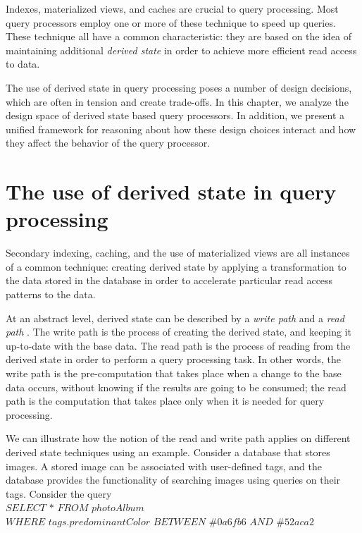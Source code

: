 Indexes, materialized views, and caches are crucial to query processing.
Most query processors employ one or more of these technique to speed up queries.
These technique all have a common characteristic:
they are based on the idea of maintaining additional \textit{derived state} in order to achieve more efficient read
access to data.

The use of derived state in query processing poses a number of design decisions,
which are often in tension and create trade-offs.
In this chapter, we analyze the design space of derived state based query processors.
In addition, we present a unified framework for reasoning about how these design choices interact
and how they affect the behavior of the query processor.


\section{The use of derived state in query processing}
\label{sec:read_write_path}

Secondary indexing, caching, and the use of materialized views are all instances of a common technique:
creating derived state by applying a transformation to the data stored in the database in order to accelerate particular
read access patterns to the data.

At an abstract level, derived state can be described by a \textit{write path} and a \textit{read path}
\cite{kleppmann:designing}.
The write path is the process of creating the derived state, and keeping it up-to-date with the base data.
The read path is the process of reading from the derived state in order to perform a query processing task.
In other words, the write path is the pre-computation that takes place when a change to the base data occurs,
without knowing if the results are going to be consumed;
the read path is the computation that takes place only when it is needed for query processing.

\medskip

We can illustrate how the notion of the read and write path applies on different derived state techniques using an example.
Consider a database that stores images.
A stored image can be associated with user-defined tags, and the database provides the functionality of searching
images using queries on their tags.
Consider the query \\

\noindent
$SELECT$ $*$ $FROM$ $photoAlbum$ \\
$WHERE$ $tags.predominantColor$ $BETWEEN$ $\#0a6fb6$ $AND$ $\#52aca2$ \\

